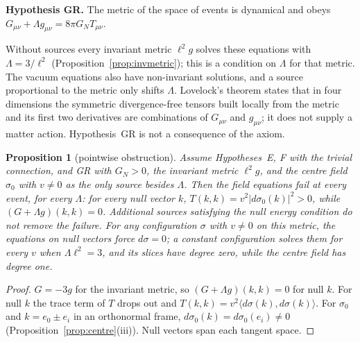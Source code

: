 \documentclass[aps,pra,onecolumn,superscriptaddress,nofootinbib,10pt]{revtex4-2}
\newtheorem{proposition}[theorem]{Proposition}
\theoremstyle{definition}
\theoremstyle{remark}
\newcommand{\ip}[2]{\langle #1,#2\rangle}
\begin{document}
\smallskip\noindent\textbf{Hypothesis GR.}\label{hyp:GR}  The metric of the space of events is dynamical and obeys
$G_{\mu\nu}+\Lambda g_{\mu\nu}=8\pi G_NT_{\mu\nu}$.

\smallskip\noindent Without sources every invariant metric $\ell^2g$ solves these equations with $\Lambda=3/\ell^2$
(Proposition~\ref{prop:invmetric}); this is a condition on $\Lambda$ for that metric.  The vacuum equations also
have non-invariant solutions, and a source proportional to the metric only shifts $\Lambda$.  Lovelock's
theorem \cite{Lovelock} states that in four dimensions the symmetric divergence-free tensors built locally
from the metric and its first two derivatives are combinations of $G_{\mu\nu}$ and $g_{\mu\nu}$; it does not
supply a matter action.  Hypothesis~GR is not a consequence of the axiom.

\begin{proposition}[pointwise obstruction]\label{prop:nullobstruction}
Assume Hypotheses~E, F with the trivial connection, and GR with $G_N>0$, the invariant metric $\ell^2g$,
and the centre field $\sigma_0$ with $v\ne0$ as the only source besides $\Lambda$.  Then the field equations fail
at every event, for every $\Lambda$: for every null vector $k$, $T(k,k)=v^2\lvert d\sigma_0(k)\rvert^2>0$, while
$(G+\Lambda g)(k,k)=0$.  Additional sources satisfying the null energy condition do not remove the
failure.  For any configuration $\sigma$ with $v\ne0$ on this metric, the equations on null vectors force
$d\sigma=0$; a constant configuration solves them for every $v$ when $\Lambda\ell^2=3$, and its slices have degree zero, while the
centre field has degree one.
\end{proposition}
\begin{proof}
$G=-3g$ for the invariant metric, so $(G+\Lambda g)(k,k)=0$ for null $k$.  For null $k$ the trace term of
$T$ drops out and $T(k,k)=v^2\ip{d\sigma(k)}{d\sigma(k)}$.  For $\sigma_0$ and $k=e_0\pm e_i$ in an orthonormal
frame, $d\sigma_0(k)=d\sigma_0(e_i)\ne0$ (Proposition~\ref{prop:centre}(iii)).  Null vectors span each tangent space.
\end{proof}
\end{document}
